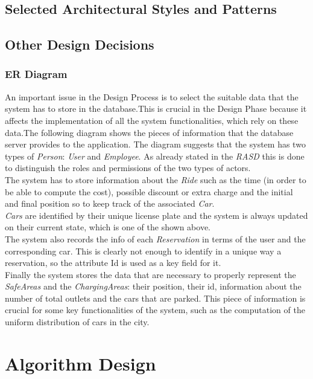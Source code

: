 \documentclass[11pt,a4paper]{report}
\begin{document}
\section{Selected Architectural Styles and Patterns}
\section{Other Design Decisions}
\subsection{ER Diagram}
An important issue in the Design Process is to select the suitable data that the system has to store in the database.This is crucial in the Design Phase because it affects the implementation of all the system functionalities, which rely on these data.The following diagram shows the pieces of information that the database server provides to the application.
\noindent The diagram suggests that the system has two types of \textit{Person}: \textit{User} and \textit{Employee}. As already stated in the \textit{RASD} this is done to distinguish the roles and permissions of the two types of actors.\\
The system has to store information about the \textit{Ride} such as the time (in order to be able to compute the cost), possible discount or extra charge and the initial and final position so to keep track of the associated \textit{Car}.\\\textit{Cars} are identified by their unique license plate and the system is always updated on their current state, which is one of the shown above.\\The system also records the info of each \textit{Reservation} in terms of the user and the corresponding car. This is clearly not enough to identify in a unique way a reservation, so the attribute Id is used as a key field for it.\\
Finally the system stores the data that are necessary to properly represent the \textit{SafeAreas} and the \textit{ChargingAreas}: their position, their id, information about the number of total outlets and the cars that are parked. This piece of information is crucial for some key functionalities of the system, such as the computation of the uniform distribution of cars in the city.

\chapter{Algorithm Design}
\end{document}
